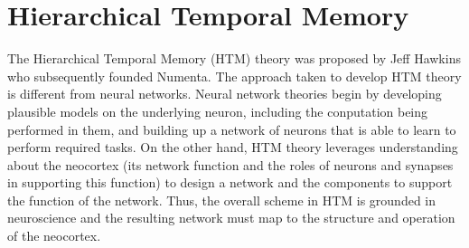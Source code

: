 \chapter{Hierarchical Temporal Memory}

The Hierarchical Temporal Memory (HTM) \cite{George2009} theory was proposed by Jeff Hawkins who subsequently founded Numenta. The approach taken to develop HTM theory is different from neural networks. Neural network theories begin by developing plausible models on the underlying neuron, including the conputation being performed in them, and building up a network of neurons that is able to learn to perform required tasks. On the other hand, HTM theory leverages understanding about the neocortex (its network function and the roles of neurons and synapses in supporting this function) to design a network and the components to support the function of the network. Thus, the overall scheme in HTM is grounded in neuroscience and the resulting network must map to the structure and operation of the neocortex.


